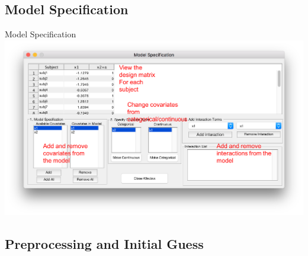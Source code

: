 \documentclass[11pt]{beamer}
\begin{document}
\subsection{Model Specification}
\begin{frame}{Model Specification}
\includegraphics[width=1\linewidth]{figs/covWindowAnnot}
\end{frame}


\subsection{Preprocessing and Initial Guess}
\end{document}
